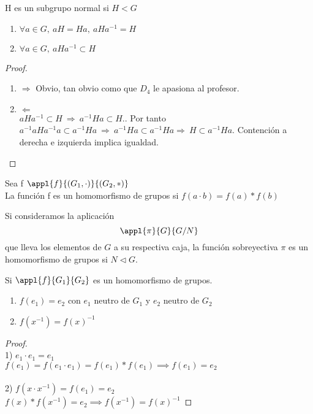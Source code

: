 \documentclass[a4paper,10pt]{apuntes}
\begin{document}
 
 \begin{theorem}
 H es un subgrupo normal si $H<G$
 \begin{enumerate}
 \item $\forall a \in G,\ aH = Ha,\ aHa^{-1}=H$
 \item $\forall a \in G,\ aHa^{-1} \subset H$
 \end{enumerate}
 \end{theorem}
 \begin{proof}
 \begin{enumerate}
  \item $\Rightarrow$  Obvio, tan obvio como que $D_4$ le apasiona al profesor.
  \item $\Leftarrow$\\
  $aHa^{-1} \subset H \ \Rightarrow \ a^{-1}Ha\subset H.$. Por tanto $a^{-1}aHa^{-1}a \subset a^{-1}Ha \ \Rightarrow \ a^{-1}Ha \subset  a^{-1}Ha \Rightarrow \ H \subset a^{-1}Ha$.
  Contención a derecha e izquierda implica igualdad.
 \end{enumerate}
 \end{proof}
 
 \begin{defn}
 Sea f $\appl{f}{(G_1, \cdot )}{(G_2, \ast )}$\\
 La función f es un homomorfismo de grupos si 
 $f(a\cdot b) = f(a)\ast f(b)$
 \end{defn}
 
 \begin{example}
 Si consideramos la aplicación $$\appl{\pi}{G}{G/N}$$ que lleva
 los elementos de $G$ a su respectiva caja, la función sobreyectiva $\pi$ es 
 un homomorfismo de grupos si $N\lhd G$.
 \end{example}
 
 \begin{props} 
 Si $\appl{f}{G_1}{G_2}$ es un homomorfismo de grupos.
 \begin{enumerate}
 \item $f(e_1) = e_2$ con $e_1$ neutro de $G_1$ y $e_2$ neutro de $G_2$
 \item $f(x^{-1}) = f(x)^{-1}$
 \end{enumerate}
 \end{props}
 
 \begin{proof} \\
 1) $e_1\cdot e_1 = e_1$\\ 
 $f(e_1)=f(e_1\cdot e_1) = f(e_1)\ast f(e_1) \implies f(e_1) = e_2$\\
 \\
 2) $f(x\cdot x^{-1}) = f(e_1) = e_2$\\ 
 $f(x)\ast f(x^{-1}) = e_2 \implies f(x^{-1}) = f(x)^{-1}$
 
 \end{proof}
 
\end{document}
